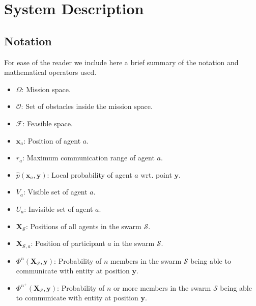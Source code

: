 \section{System Description}

\subsection{Notation}
For ease of the reader we include here a brief summary of the notation and mathematical operators used.
\begin{itemize}
  \item $\Omega$: Mission space.
  \item $\mathcal{O}$: Set of obstacles inside the mission space.
  \item $\mathcal{F}$: Feasible space.
  \item $\mathbf{x}_{a}$: Position of agent $a$.
  \item $r_{a}$: Maximum communication range of agent $a$.
  \item $\hat{p}(\mathbf{x}_{a}, \mathbf{y})$: Local probability of agent $a$ wrt. point $\mathbf{y}$.
  \item $V_{a}$: Visible set of agent $a$.
  \item $U_{a}$: Invisible set of agent $a$.
  \item $\mathbf{X}_{\mathcal{S}}$: Positions of all agents in the swarm $\mathcal{S}$.
  \item $\mathbf{X}_{\mathcal{S}, a}$: Position of participant $a$ in the swarm $\mathcal{S}$.
  \item $\Phi^{n}(\mathbf{X_{\mathcal{S}}}, \mathbf{y})$: Probability of $n$ members in the swarm $\mathcal{S}$ being able to communicate with entity at position $\mathbf{y}$.
  \item $\Phi^{n^{+}}(\mathbf{X_{\mathcal{S}}}, \mathbf{y})$: Probability of $n$ or more members in the swarm $\mathcal{S}$ being able to communicate with entity at position $\mathbf{y}$.
\end{itemize}

